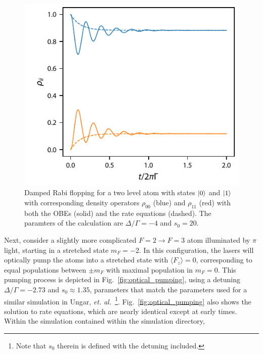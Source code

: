 \documentclass[final,5p,times,twocolumn]{elsarticle}
\begin{document}
\begin{figure}
	\center
	\includegraphics{figs/damped_rabi_flopping.pdf}
	\caption{\label{fig:rabi_flopping} Damped Rabi flopping for a two level atom with states $\ket{0}$ and $\ket{1}$ with corresponding density operators $\rho_{00}$ (blue) and $\rho_{11}$ (red) with both the OBEs (solid) and the rate equations (dashed).  The paramters of the calculation are $\Delta/\Gamma=-4$ and $s_0=20$.}
\end{figure}

Next, consider a slightly more complicated $F=2\rightarrow F=3$ atom illuminated by $\pi$ light, starting in a stretched state $m_F=-2$.  In this configuration, the lasers will optically pump the atoms into a stretched state with $\langle F_z \rangle = 0$, corresponding to equal populations between $\pm m_F$ with maximal population in $m_F=0$.  This pumping process is depicted in Fig.~\ref{fig:optical_pumping}, using a detuning $\Delta/\Gamma = -2.73$ and $s_0\approx 1.35$, parameters that match the parameters used for a similar simulation in Ungar, {\it et. al.}~\cite{Ungar1989}\footnote{Note that $s_0$ therein is defined with the detuning included.}.  Fig.~\ref{fig:optical_pumping} also shows the solution to rate equations, which are nearly identical except at early times.  Within the simulation contained within the simulation directory, 
\end{document}
